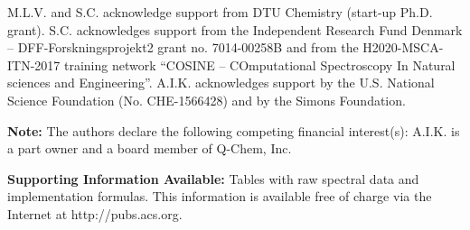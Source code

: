 \documentclass[journal=jctcce,manuscript=article]{achemso}
\begin{document}
\begin{acknowledgement}
M.L.V. and S.C. acknowledge support from DTU Chemistry (start-up Ph.D. grant). S.C. acknowledges support from the Independent Research Fund Denmark -- DFF-Forskningsprojekt2 grant no. 7014-00258B and from the H2020-MSCA-ITN-2017 training network ``COSINE -- COmputational Spectroscopy In Natural sciences and Engineering''.
A.I.K.  acknowledges support by  the U.S.  National Science Foundation
(No.  CHE-1566428) and by the Simons Foundation. 

{\bf Note:} The authors declare the following competing financial
interest(s): A.I.K. is a part owner and a board member of Q-Chem, Inc.
\end{acknowledgement}


\textbf{Supporting Information Available:}
Tables with raw spectral data and implementation formulas.
This information is available free of charge via the Internet at http://pubs.acs.org.

%
  




\end{document}
